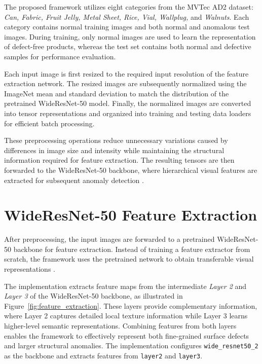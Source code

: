 \documentclass[12pt,openany,oneside]{book}
\begin{document}
The proposed framework utilizes eight categories from the MVTec AD2 dataset: \textit{Can, Fabric, Fruit Jelly, Metal Sheet, Rice, Vial, Wallplug,} and \textit{Walnuts}. Each category contains normal training images and both normal and anomalous test images. During training, only normal images are used to learn the representation of defect-free products, whereas the test set contains both normal and defective samples for performance evaluation.

Each input image is first resized to the required input resolution of the feature extraction network. The resized images are subsequently normalized using the ImageNet mean and standard deviation to match the distribution of the pretrained WideResNet-50 model. Finally, the normalized images are converted into tensor representations and organized into training and testing data loaders for efficient batch processing.

These preprocessing operations reduce unnecessary variations caused by differences in image size and intensity while maintaining the structural information required for feature extraction. The resulting tensors are then forwarded to the WideResNet-50 backbone, where hierarchical visual features are extracted for subsequent anomaly detection \cite{aqeel2025comet}.

\section{WideResNet-50 Feature Extraction}

After preprocessing, the input images are forwarded to a pretrained WideResNet-50 backbone for feature extraction. Instead of training a feature extractor from scratch, the framework uses the pretrained network to obtain transferable visual representations \cite{zagoruyko2016wideresnet,aqeel2025comet}.

The implementation extracts feature maps from the intermediate \textit{Layer 2} and \textit{Layer 3} of the WideResNet-50 backbone, as illustrated in Figure~\ref{fig:feature_extraction}. These layers provide complementary information, where Layer 2 captures detailed local texture information while Layer 3 learns higher-level semantic representations. Combining features from both layers enables the framework to effectively represent both fine-grained surface defects and larger structural anomalies. The implementation configures \texttt{wide\_resnet50\_2} as the backbone and extracts features from \texttt{layer2} and \texttt{layer3}.
\end{document}
